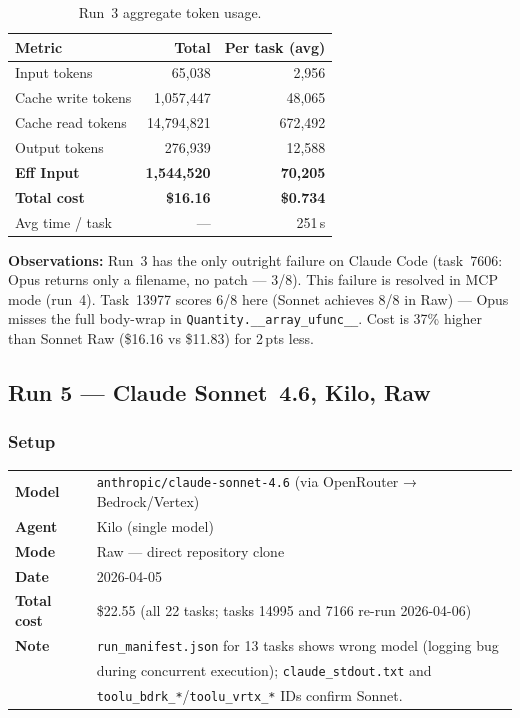 \begin{table}[h]
\centering
\caption{Run~3 aggregate token usage.}\label{tab:r3-tokens}
\begin{tabular}{lrr}
\toprule
\textbf{Metric} & \textbf{Total} & \textbf{Per task (avg)} \\
\midrule
Input tokens         & 65,038     & 2,956  \\
Cache write tokens   & 1,057,447  & 48,065 \\
Cache read tokens    & 14,794,821 & 672,492 \\
Output tokens        & 276,939    & 12,588 \\
\midrule
\textbf{Eff Input}   & \textbf{1,544,520} & \textbf{70,205} \\
\textbf{Total cost}  & \textbf{\$16.16}   & \textbf{\$0.734} \\
Avg time / task      & ---        & 251\,s \\
\bottomrule
\end{tabular}
\end{table}

\noindent
\textbf{Observations:} Run~3 has the only outright failure on Claude Code
(task~7606: Opus returns only a filename, no patch --- 3/8).
This failure is resolved in MCP mode (run~4).
Task~13977 scores 6/8 here (Sonnet achieves 8/8 in Raw) --- Opus misses
the full body-wrap in \texttt{Quantity.\_\_array\_ufunc\_\_}.
Cost is 37\% higher than Sonnet Raw (\$16.16 vs \$11.83) for 2\,pts less.

\subsection{Run 5 --- Claude Sonnet~4.6, Kilo, Raw}
\label{sec:run5}

\subsubsection{Setup}

\begin{tabular}{ll}
\textbf{Model}     & \texttt{anthropic/claude-sonnet-4.6} (via OpenRouter → Bedrock/Vertex) \\
\textbf{Agent}     & Kilo (single model) \\
\textbf{Mode}      & Raw --- direct repository clone \\
\textbf{Date}      & 2026-04-05 \\
\textbf{Total cost} & \$22.55 (all 22 tasks; tasks 14995 and 7166 re-run 2026-04-06) \\
\textbf{Note}      & \texttt{run\_manifest.json} for 13 tasks shows wrong model (logging bug \\
                   & during concurrent execution); \texttt{claude\_stdout.txt} and \\
                   & \texttt{toolu\_bdrk\_*}/\texttt{toolu\_vrtx\_*} IDs confirm Sonnet. \\
\end{tabular}

